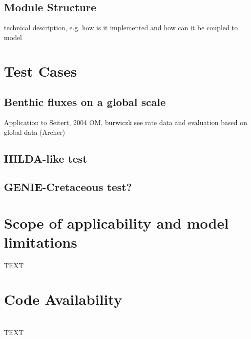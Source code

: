 \documentclass[gmd, manuscript]{copernicus}
\begin{document}
\subsection{Module Structure}
technical description, e.g. how is it implemented and how can it be coupled to model

\section {Test Cases}
\subsection{Benthic fluxes on a global scale}
Application to Seitert, 2004 OM, burwiczk see rate data and evaluation based on global data (Archer)

\subsection{HILDA-like test}

\subsection{GENIE-Cretaceous test?}

\section{Scope of applicability and model limitations}



\conclusions  %
TEXT

\section {Code Availability}


\appendix
\section{}    %

\subsection{}                               %




\begin{acknowledgements}
TEXT
\end{acknowledgements}
\end{document}
